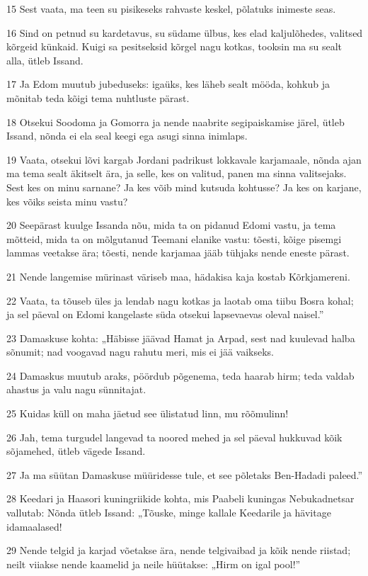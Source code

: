 \par 15 Sest vaata, ma teen su pisikeseks rahvaste keskel, põlatuks inimeste seas.
\par 16 Sind on petnud su kardetavus, su südame ülbus, kes elad kaljulõhedes, valitsed kõrgeid künkaid. Kuigi sa pesitseksid kõrgel nagu kotkas, tooksin ma su sealt alla, ütleb Issand.
\par 17 Ja Edom muutub jubeduseks: igaüks, kes läheb sealt mööda, kohkub ja mõnitab teda kõigi tema nuhtluste pärast.
\par 18 Otsekui Soodoma ja Gomorra ja nende naabrite segipaiskamise järel, ütleb Issand, nõnda ei ela seal keegi ega asugi sinna inimlaps.
\par 19 Vaata, otsekui lõvi kargab Jordani padrikust lokkavale karjamaale, nõnda ajan ma tema sealt äkitselt ära, ja selle, kes on valitud, panen ma sinna valitsejaks. Sest kes on minu sarnane? Ja kes võib mind kutsuda kohtusse? Ja kes on karjane, kes võiks seista minu vastu?
\par 20 Seepärast kuulge Issanda nõu, mida ta on pidanud Edomi vastu, ja tema mõtteid, mida ta on mõlgutanud Teemani elanike vastu: tõesti, kõige pisemgi lammas veetakse ära; tõesti, nende karjamaa jääb tühjaks nende eneste pärast.
\par 21 Nende langemise mürinast väriseb maa, hädakisa kaja kostab Kõrkjamereni.
\par 22 Vaata, ta tõuseb üles ja lendab nagu kotkas ja laotab oma tiibu Bosra kohal; ja sel päeval on Edomi kangelaste süda otsekui lapsevaevas oleval naisel.”
\par 23 Damaskuse kohta: „Häbisse jäävad Hamat ja Arpad, sest nad kuulevad halba sõnumit; nad voogavad nagu rahutu meri, mis ei jää vaikseks.
\par 24 Damaskus muutub araks, pöördub põgenema, teda haarab hirm; teda valdab ahastus ja valu nagu sünnitajat.
\par 25 Kuidas küll on maha jäetud see ülistatud linn, mu rõõmulinn!
\par 26 Jah, tema turgudel langevad ta noored mehed ja sel päeval hukkuvad kõik sõjamehed, ütleb vägede Issand.
\par 27 Ja ma süütan Damaskuse müüridesse tule, et see põletaks Ben-Hadadi paleed.”
\par 28 Keedari ja Haasori kuningriikide kohta, mis Paabeli kuningas Nebukadnetsar vallutab: Nõnda ütleb Issand: „Tõuske, minge kallale Keedarile ja hävitage idamaalased!
\par 29 Nende telgid ja karjad võetakse ära, nende telgivaibad ja kõik nende riistad; neilt viiakse nende kaamelid ja neile hüütakse: „Hirm on igal pool!”
